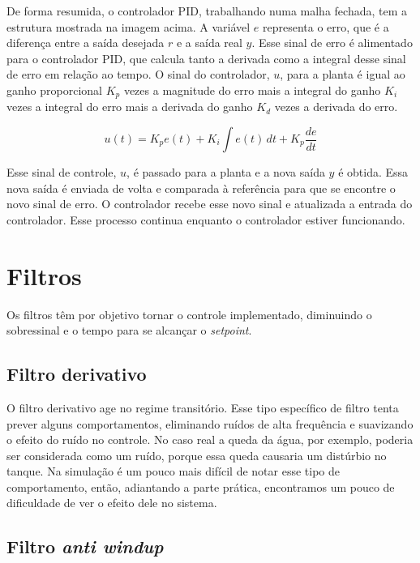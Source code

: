 \documentclass[
	12pt,				%
	openany,			%
	oneside,			%
	a4paper,			%
	english,			%
	french,				%
	spanish,			%
	brazil,				%
	]{abntex2}
\begin{document}
{De forma resumida, o controlador PID, trabalhando numa malha fechada, tem a estrutura mostrada na imagem acima. A variável $e$ representa o erro, que é a diferença entre a saída desejada $r$ e a saída real $y$. Esse sinal de erro é alimentado para o controlador PID, que calcula tanto a derivada como a integral desse sinal de erro em relação ao tempo. O sinal do controlador, $u$, para a planta é igual ao ganho proporcional $K_p$ vezes a magnitude do erro mais a integral do ganho $K_i$ vezes a integral do erro mais a derivada do ganho $K_d$ vezes a derivada do erro.

\begin{equation}
u(t) = K_pe(t) + K_i\int e(t)\,dt + K_p\frac{de}{dt}
\end{equation}

Esse sinal de controle, $u$, é passado para a planta e a nova saída $y$ é obtida. Essa nova saída é enviada de volta e comparada à referência para que se encontre o novo sinal de erro. O controlador recebe esse novo sinal e atualizada a entrada do controlador. Esse processo continua enquanto o controlador estiver funcionando.

\section{Filtros}

Os filtros têm por objetivo tornar o controle implementado, diminuindo o sobressinal e o tempo para se alcançar o \textit{setpoint}.

\subsection{Filtro derivativo}

O filtro derivativo age no regime transitório. Esse tipo específico de filtro tenta prever alguns comportamentos, eliminando ruídos de alta frequência e suavizando o efeito do ruído no controle. No caso real a queda da água, por exemplo, poderia ser considerada como um ruído, porque essa queda causaria um distúrbio no tanque. Na simulação é um pouco mais difícil de notar esse tipo de comportamento, então, adiantando a parte prática, encontramos um pouco de dificuldade de ver o efeito dele no sistema.

\subsection{Filtro \textit{anti windup}}

}
\end{document}

